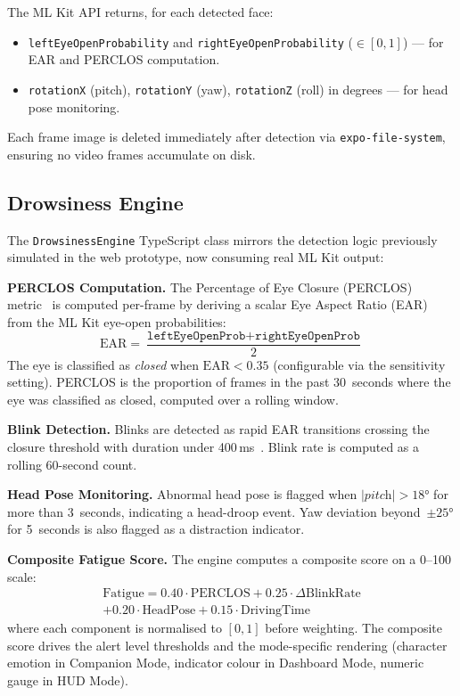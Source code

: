 \documentclass[sigconf]{acmart}
\begin{document}
The ML Kit API returns, for each detected face:
\begin{itemize}
    \item \texttt{leftEye\allowbreak{}Open\allowbreak{}Probability} and \texttt{rightEye\allowbreak{}Open\allowbreak{}Probability} ($\in [0,1]$) --- for EAR and PERCLOS computation.
    \item \texttt{rotationX} (pitch), \texttt{rotationY} (yaw), \texttt{rotationZ} (roll) in degrees --- for head pose monitoring.
\end{itemize}

Each frame image is deleted immediately after detection via \texttt{expo-file-system}, ensuring no video frames accumulate on disk.

\subsection{Drowsiness Engine}

The \texttt{DrowsinessEngine} TypeScript class mirrors the detection logic previously simulated in the web prototype, now consuming real ML Kit output:

\textbf{PERCLOS Computation.} The Percentage of Eye Closure (PERCLOS) metric~\cite{ref20} is computed per-frame by deriving a scalar Eye Aspect Ratio (EAR)~\cite{ref19} from the ML Kit eye-open probabilities:
\[
\text{EAR} = \frac{\texttt{leftEyeOpenProb} + \texttt{rightEyeOpenProb}}{2}
\]
The eye is classified as \textit{closed} when $\text{EAR} < 0.35$ (configurable via the sensitivity setting). PERCLOS is the proportion of frames in the past 30~seconds where the eye was classified as closed, computed over a rolling window.

\textbf{Blink Detection.} Blinks are detected as rapid EAR transitions crossing the closure threshold with duration under 400\,ms~\cite{ref19}. Blink rate is computed as a rolling 60-second count.

\textbf{Head Pose Monitoring.} Abnormal head pose is flagged when $|\textit{pitch}| > 18°$ for more than 3~seconds, indicating a head-droop event. Yaw deviation beyond~$\pm 25°$ for 5~seconds is also flagged as a distraction indicator.

\textbf{Composite Fatigue Score.} The engine computes a composite score on a 0--100 scale:
\begin{multline*}
\text{Fatigue} = 0.40 \cdot \text{PERCLOS} + 0.25 \cdot \Delta\text{BlinkRate} \\
+ 0.20 \cdot \text{HeadPose} + 0.15 \cdot \text{DrivingTime}
\end{multline*}
where each component is normalised to $[0,1]$ before weighting. The composite score drives the alert level thresholds and the mode-specific rendering (character emotion in Companion Mode, indicator colour in Dashboard Mode, numeric gauge in HUD Mode).
\end{document}
